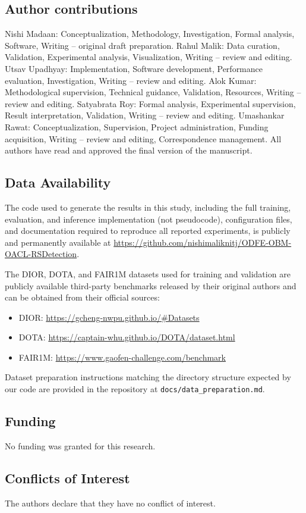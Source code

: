\subsection*{Author contributions}
Nishi Madaan: Conceptualization, Methodology, Investigation, Formal analysis, Software,
Writing -- original draft preparation. Rahul Malik: Data curation, Validation, Experimental
analysis, Visualization, Writing -- review and editing. Utsav Upadhyay: Implementation,
Software development, Performance evaluation, Investigation, Writing -- review and editing.
Alok Kumar: Methodological supervision, Technical guidance, Validation, Resources,
Writing -- review and editing. Satyabrata Roy: Formal analysis, Experimental supervision,
Result interpretation, Validation, Writing -- review and editing. Umashankar Rawat:
Conceptualization, Supervision, Project administration, Funding acquisition,
Writing -- review and editing, Correspondence management. All authors have read and
approved the final version of the manuscript.

\subsection*{Data Availability}
The code used to generate the results in this study, including the full training,
evaluation, and inference implementation (not pseudocode), configuration files, and
documentation required to reproduce all reported experiments, is publicly and
permanently available at
\url{https://github.com/nishimaliknitj/ODFE-OBM-OACL-RSDetection}.

The DIOR, DOTA, and FAIR1M datasets used for training and validation are publicly
available third-party benchmarks released by their original authors and can be
obtained from their official sources:
\begin{itemize}
  \item DIOR: \url{https://gcheng-nwpu.github.io/#Datasets}
  \item DOTA: \url{https://captain-whu.github.io/DOTA/dataset.html}
  \item FAIR1M: \url{https://www.gaofen-challenge.com/benchmark}
\end{itemize}
Dataset preparation instructions matching the directory structure expected by our
code are provided in the repository at \texttt{docs/data\_preparation.md}.

\subsection*{Funding}
No funding was granted for this research.

\subsection*{Conflicts of Interest}
The authors declare that they have no conflict of interest.
